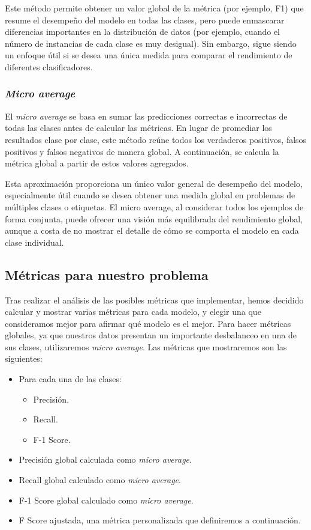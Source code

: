Este método permite obtener un valor global de la métrica (por ejemplo, F1) que resume el desempeño del modelo en todas las clases, pero puede enmascarar diferencias importantes en la distribución de datos (por ejemplo, cuando el número de instancias de cada clase es muy desigual). Sin embargo, sigue siendo un enfoque útil si se desea una única medida para comparar el rendimiento de diferentes clasificadores. 


\subsubsection{\emph{Micro average}}
El \emph{micro average} se basa en sumar las predicciones correctas e incorrectas de todas las clases antes de calcular las métricas. En lugar de promediar los resultados clase por clase, este método reúne todos los verdaderos positivos, falsos positivos y falsos negativos de manera global. A continuación, se calcula la métrica global a partir de estos valores agregados.

Esta aproximación proporciona un único valor general de desempeño del modelo, especialmente útil cuando se desea obtener una medida global en problemas de múltiples clases o etiquetas. El micro average, al considerar todos los ejemplos de forma conjunta, puede ofrecer una visión más equilibrada del rendimiento global, aunque a costa de no mostrar el detalle de cómo se comporta el modelo en cada clase individual. 


\subsection{Métricas para nuestro problema}
Tras realizar el análisis de las posibles métricas que implementar, hemos decidido calcular y mostrar varias métricas para cada modelo, y elegir una que consideramos mejor para afirmar qué modelo es el mejor. Para hacer métricas globales, ya que nuestros datos presentan un importante desbalanceo en una de sus clases, utilizaremos \emph{micro average}. Las métricas que mostraremos son las siguientes:

\begin{itemize}
	\item Para cada una de las clases:
	\begin{itemize}
		\item Precisión.
		\item Recall.
		\item F-1 Score.
	\end{itemize}
	\item Precisión global calculada como \emph{micro average}.
	\item Recall global calculado como \emph{micro average}.
	\item F-1 Score global calculado como \emph{micro average}.
	\item F Score ajustada, una métrica personalizada que definiremos a continuación.
\end{itemize}

